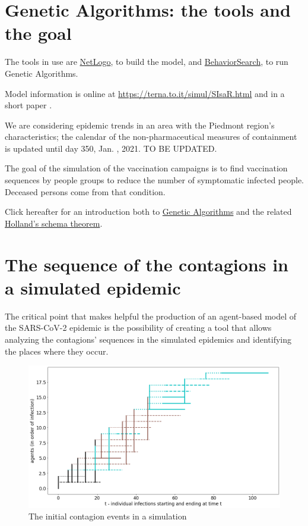 \documentclass[graybox]{svmult}
\begin{document}
\section{Genetic Algorithms: the tools and the goal}
\label{tools}

The tools in use are \href{https://ccl.northwestern.edu/netlogo/}{NetLogo}, to build the model, and  \href{https://www.behaviorsearch.org}{BehaviorSearch}, to run Genetic Algorithms. 

Model information is online at \url{https://terna.to.it/simul/SIsaR.html} and in a short paper \cite{pescarmonacan}.

We are considering epidemic trends in an area with the Piedmont region's characteristics; the calendar of the non-pharmaceutical measures of containment is updated until day 350, Jan. , 2021. {\color{red}TO BE UPDATED}.

The goal of the simulation of the vaccination campaigns is to find vaccination sequences by people groups to reduce the number of symptomatic infected people. Deceased persons come from that condition.

Click hereafter for an introduction both to \href{https://en.wikipedia.org/wiki/Genetic_algorithm}{Genetic Algorithms} and the related  \href{https://en.wikipedia.org/wiki/Holland%27s_schema_theorem}{Holland's schema theorem}.


\section{The sequence of the contagions in a simulated epidemic}\label{sequence}

The critical point that makes helpful the production of an agent-based model of the SARS-CoV-2 epidemic is the possibility of creating a tool that allows analyzing the contagions' sequences in the simulated epidemics and identifying the places where they occur. 


\begin{figure}[t]
\center
\includegraphics[scale=0.3]{startingCase.png}

\caption{The initial contagion events in a simulation} 
\label{startingCase}
\end{figure}
\end{document}
